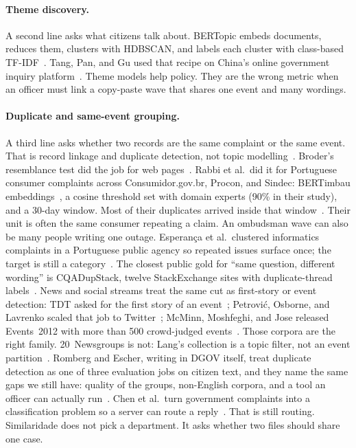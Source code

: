 \documentclass[acmlarge,screen]{acmart}
\begin{document}
\paragraph{Theme discovery.}
A second line asks what citizens talk about. BERTopic embeds documents, reduces them, clusters with HDBSCAN, and labels each cluster with class-based TF-IDF~\cite{grootendorst2022bertopic}. Tang, Pan, and Gu used that recipe on China's online government inquiry platform~\cite{tang2024bertopic}. Theme models help policy. They are the wrong metric when an officer must link a copy-paste wave that shares one event and many wordings.

\paragraph{Duplicate and same-event grouping.}
A third line asks whether two records are the same complaint or the same event. That is record linkage and duplicate detection, not topic modelling~\cite{fellegi1969linkage,elmagarmid2007duplicate}. Broder's resemblance test did the job for web pages~\cite{broder1997resemblance}. Rabbi et al.\ did it for Portuguese consumer complaints across Consumidor.gov.br, Procon, and Sindec: BERTimbau embeddings~\cite{souza2020bertimbau}, a cosine threshold set with domain experts (90\% in their study), and a 30-day window. Most of their duplicates arrived inside that window~\cite{rabbi2026duplicate}. Their unit is often the same consumer repeating a claim. An ombudsman wave can also be many people writing one outage. Esperan\c{c}a et al.\ clustered informatics complaints in a Portuguese public agency so repeated issues surface once; the target is still a category~\cite{esperanca2025complaint}. The closest public gold for ``same question, different wording'' is CQADupStack, twelve StackExchange sites with duplicate-thread labels~\cite{hoogeveen2015cqadupstack}. News and social streams treat the same cut as first-story or event detection: TDT asked for the first story of an event~\cite{allan1998tdt}; Petrovi{\'c}, Osborne, and Lavrenko scaled that job to Twitter~\cite{petrovic2010fsd}; McMinn, Moshfeghi, and Jose released Events~2012 with more than 500 crowd-judged events~\cite{mcminn2013events}. Those corpora are the right family. 20~Newsgroups is not: Lang's collection is a topic filter, not an event partition~\cite{lang1995newsweeder}. Romberg and Escher, writing in DGOV itself, treat duplicate detection as one of three evaluation jobs on citizen text, and they name the same gaps we still have: quality of the groups, non-English corpora, and a tool an officer can actually run~\cite{romberg2023citizens}. Chen et al.\ turn government complaints into a classification problem so a server can route a reply~\cite{chen2022igcp}. That is still routing. Similaridade does not pick a department. It asks whether two files should share one case.
\end{document}
